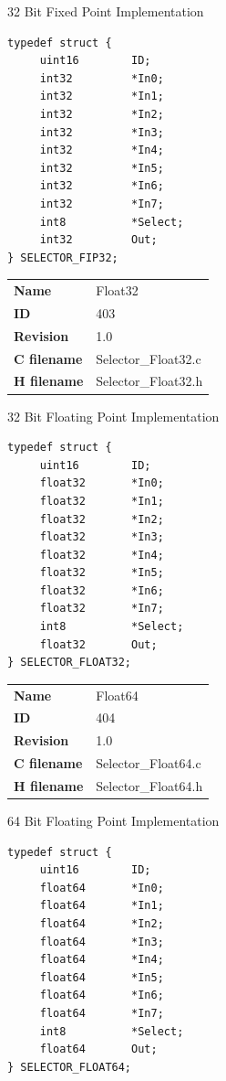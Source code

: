 32 Bit Fixed Point Implementation

\begin{lstlisting}
typedef struct {
     uint16        ID;
     int32         *In0;
     int32         *In1;
     int32         *In2;
     int32         *In3;
     int32         *In4;
     int32         *In5;
     int32         *In6;
     int32         *In7;
     int8          *Select;
     int32         Out;
} SELECTOR_FIP32;
\end{lstlisting}

\ifdefined \AddTestReports
{}
\fi
{}
\nopagebreak[0]
\begin{tabular}{l l}
\textbf{Name} & Float32 \tabularnewline
\textbf{ID} & 403 \tabularnewline
\textbf{Revision} & 1.0 \tabularnewline
\textbf{C filename} & Selector\_Float32.c \tabularnewline
\textbf{H filename} & Selector\_Float32.h \tabularnewline
\end{tabular}
\vspace{1ex}

32 Bit Floating Point Implementation

\begin{lstlisting}
typedef struct {
     uint16        ID;
     float32       *In0;
     float32       *In1;
     float32       *In2;
     float32       *In3;
     float32       *In4;
     float32       *In5;
     float32       *In6;
     float32       *In7;
     int8          *Select;
     float32       Out;
} SELECTOR_FLOAT32;
\end{lstlisting}

\ifdefined \AddTestReports
{}
\fi
{}
\nopagebreak[0]
\begin{tabular}{l l}
\textbf{Name} & Float64 \tabularnewline
\textbf{ID} & 404 \tabularnewline
\textbf{Revision} & 1.0 \tabularnewline
\textbf{C filename} & Selector\_Float64.c \tabularnewline
\textbf{H filename} & Selector\_Float64.h \tabularnewline
\end{tabular}
\vspace{1ex}

64 Bit Floating Point Implementation

\begin{lstlisting}
typedef struct {
     uint16        ID;
     float64       *In0;
     float64       *In1;
     float64       *In2;
     float64       *In3;
     float64       *In4;
     float64       *In5;
     float64       *In6;
     float64       *In7;
     int8          *Select;
     float64       Out;
} SELECTOR_FLOAT64;
\end{lstlisting}

\ifdefined \AddTestReports
{}
\fi
